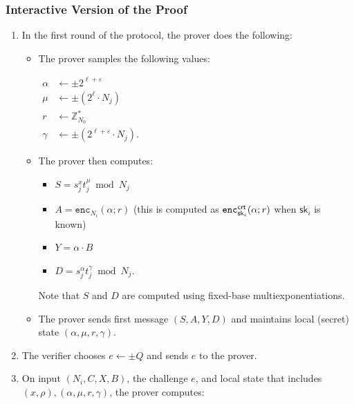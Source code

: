\documentclass[11pt]{article}
\def\crt{{\sf crt}}
\newcommand{\enc}{\ensuremath{\mathtt{enc}}}
\newcommand{\sk}{\textsf{sk}}
\newcommand{\Z}{\mathbb{Z}}
\newcommand{\?}[1]{\stackrel{?}{#1}}
\begin{document}


\subsubsection{Interactive Version of the Proof}

\begin{enumerate}
\item In the first round of the protocol, the prover does the following:
    \begin{itemize}
        \item The prover samples the following values:

        $\begin{aligned}
            \alpha &\gets \pm 2^{\ell + \varepsilon} \\
            \mu &\gets \pm (2^\ell \cdot N_j) \\
            r &\gets \Z^*_{N_0} \\
            \gamma &\gets \pm (2^{\ell + \varepsilon} \cdot N_j).
        \end{aligned}$

        \item The prover then computes:
\begin{itemize}
\item        $
            S = s_j^x t_j^\mu \bmod N_j$ 
\item            $A = \enc_{N_i}(\alpha; r)$ (this is computed as $\enc^\crt_{\sk_i}(\alpha; r)$ when $\sk_i$ is known) 
\item            $Y = \alpha \cdot B$ 
\item            $D = s_j^\alpha t_j^\gamma \bmod N_j.$ 
\end{itemize}
Note that $S$ and $D$ are computed using fixed-base multiexponentiations.
        \item The prover sends first message $(S,A,Y,D)$ and maintains local (secret) state $(\alpha,\mu,r,\gamma)$.
    \end{itemize}

    \item The verifier chooses $e \leftarrow \pm Q$ and sends $e$ to the prover.

    \item On input $(N_i, C, X, B)$, the challenge $e$, and local state that includes $(x,\rho), (\alpha,\mu,r,\gamma)$, the prover computes:


\end{enumerate}
\end{document}
